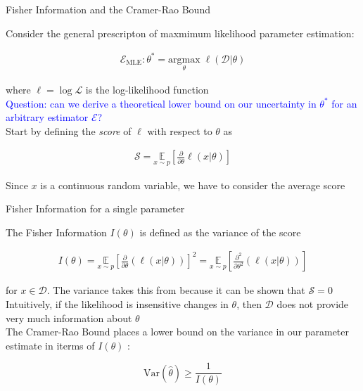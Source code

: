 \documentclass[aspectratio=1610]{beamer}					%
\begin{document}
\begin{frame}{Fisher Information and the Cramer-Rao Bound}

Consider the general prescripton of maxmimum likelihood parameter estimation:

\begin{align*}
\mathcal{E}_{\mathrm{MLE}}: \theta^{*} = \underset{\theta}{\mathrm{argmax}}\; \ell(\mathcal{D}|\theta)
\end{align*}

where $\ell = \log\mathcal{L}$ is the log-likelihood function\\
\vspace{0.1in}
\textcolor{blue}{Question: can we derive a theoretical lower bound on our uncertainty in $\theta^{*}$ for an arbitrary estimator $\mathcal{E}$?}\\
\vspace{0.1in}
Start by defining the \emph{score} of $\ell$ with respect to $\theta$ as

\begin{align*}
\mathcal{S} = \underset{{x\sim p}}{\mathbb{E}}\left[\frac{\partial}{\partial\theta} \ell(x|\theta)\right]
\end{align*}

Since $x$ is a continuous random variable, we have to consider the average score

\end{frame}

\begin{frame}{Fisher Information for a single parameter}

The Fisher Information $I(\theta)$ is defined as the variance of the score

\begin{align*}
I(\theta) = \underset{{x\sim p}}{\mathbb{E}}\left[\frac{\partial}{\partial\theta} \left(\ell(x|\theta)\right)\right]^{2} = \underset{{x\sim p}}{\mathbb{E}}\left[\frac{\partial^{2}}{\partial\theta^{2}} \left(\ell(x|\theta)\right)\right]
\end{align*}

for $x\in\mathcal{D}$. The variance takes this from because it can be shown that $\mathcal{S}=0$\\
\vspace{0.1in}
Intuitively, if the likelihood is insensitive changes in $\theta$, then $\mathcal{D}$ does not provide very much information about $\theta$\\
\vspace{0.1in}
The Cramer-Rao Bound places a lower bound on the variance in our parameter estimate in iterms of $I(\theta)$ :

\begin{equation*}
\mathrm{Var}(\hat{\theta}) \geq \frac{1}{I(\theta)}
\end{equation*}

\end{frame}
\end{document}

